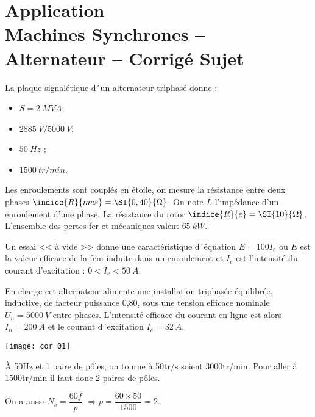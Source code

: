 \chapter*{Application  \\ 
Machines Synchrones -- Alternateur
-- \ifprof Corrigé \else Sujet \fi}

\iflivret {} \else
\ifprof  {} \else \fi
\fi

\setcounter{question}{0}


La plaque signalétique d´un alternateur triphasé donne : 
\begin{itemize}
\item $S =\SI{2}{MVA}$; 
\item $\SI{2885}{V}/\SI{5000}{V}$;
\item $\SI{50}{Hz}$ ;
\item $\SI{1500}{tr/min}$.
\end{itemize}

Les enroulements sont couplés en étoile, on mesure la résistance entre deux phases $\indice{R}{mes}=\SI{0,40}{\Omega}$.
On note $L$ l'impédance d'un enroulement d'une phase.
La résistance du rotor $\indice{R}{e}=\SI{10}{\Omega}$.
L’ensemble des pertes fer et mécaniques valent $\SI{65}{kW}$.


Un essai << à vide >> donne une caractéristique d´équation $E = 100I_e$ ou $E$ est la valeur efficace de la fem induite dans un enroulement et $I_e$ est l’intensité du courant d’excitation : $0 < I_e < \SI{50}{A}$.


En charge cet alternateur alimente une installation triphasée équilibrée, inductive, de facteur puissance 0,80, sous une tension efficace nominale $U_n = \SI{5000}{V}$ entre phases. 
L’intensité efficace du courant en ligne est alors $I_n = \SI{200}{A}$ et le courant d´excitation $I_e = \SI{32}{A}$.

\ifprof
\begin{marginfigure}
\texttt{[image: cor\_01]}
\end{marginfigure}

\begin{corrige}
À \si{50}{Hz} et 1 paire de pôles, on tourne à  \si{50}{tr/s} soient \si{3000}{tr/min}.  Pour aller à \si{1500}{tr/min} il faut donc 2 paires de pôles. 

On a aussi $N_s = \dfrac{60f}{p}$ $\Rightarrow p =\dfrac{60\times 50}{1500} = 2$.
\end{corrige}
\else
\fi

